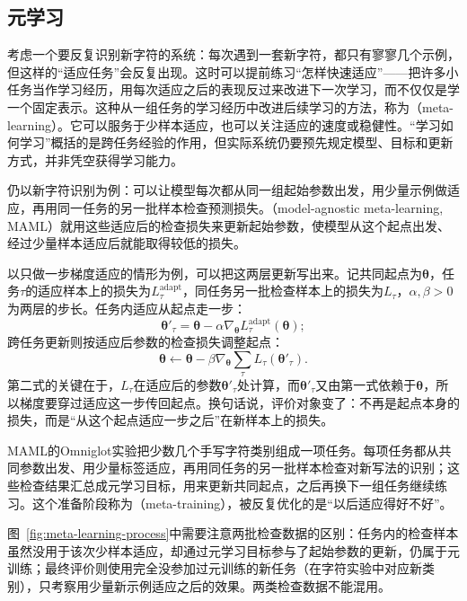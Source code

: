 \subsection{元学习}
\label{sec:meta-learning}

考虑一个要反复识别新字符的系统：每次遇到一套新字符，都只有寥寥几个示例，但这样的“适应任务”会反复出现。这时可以提前练习“怎样快速适应”——把许多小任务当作学习经历，用每次适应之后的表现反过来改进下一次学习，而不仅仅是学一个固定表示。这种从一组任务的学习经历中改进后续学习的方法，称为（meta-learning）。它可以服务于少样本适应，也可以关注适应的速度或稳健性。“学习如何学习”概括的是跨任务经验的作用，但实际系统仍要预先规定模型、目标和更新方式，并非凭空获得学习能力。

仍以新字符识别为例：可以让模型每次都从同一组起始参数出发，用少量示例做适应，再用同一任务的另一批样本检查预测损失。（model-agnostic meta-learning, MAML）就用这些适应后的检查损失来更新起始参数，使模型从这个起点出发、经过少量样本适应后就能取得较低的损失。

以只做一步梯度适应的情形为例，可以把这两层更新写出来。记共同起点为$\bm{\theta}$，任务$\tau$的适应样本上的损失为$L^{\mathrm{adapt}}_{\tau}$，同任务另一批检查样本上的损失为$L_{\tau}$，$\alpha,\beta>0$为两层的步长。任务内适应从起点走一步：
\begin{equation}
  \bm{\theta}'_{\tau}=\bm{\theta}-\alpha\nabla_{\bm{\theta}}L^{\mathrm{adapt}}_{\tau}(\bm{\theta});
  \label{eq:maml-inner-overview}
\end{equation}
跨任务更新则按适应后参数的检查损失调整起点：
\begin{equation}
  \bm{\theta}\leftarrow\bm{\theta}-\beta\nabla_{\bm{\theta}}\sum_{\tau}L_{\tau}(\bm{\theta}'_{\tau}).
  \label{eq:maml-outer-overview}
\end{equation}
第二式的关键在于，$L_{\tau}$在适应后的参数$\bm{\theta}'_{\tau}$处计算，而$\bm{\theta}'_{\tau}$又由第一式依赖于$\bm{\theta}$，所以梯度要穿过适应这一步传回起点。换句话说，评价对象变了：不再是起点本身的损失，而是“从这个起点适应一步之后”在新样本上的损失。

MAML的Omniglot实验把少数几个手写字符类别组成一项任务。每项任务都从共同参数出发、用少量标签适应，再用同任务的另一批样本检查对新写法的识别；这些检查结果汇总成元学习目标，用来更新共同起点，之后再换下一组任务继续练习。这个准备阶段称为（meta-training），被反复优化的是“以后适应得好不好”。

图~\ref{fig:meta-learning-process}中需要注意两批检查数据的区别：任务内的检查样本虽然没用于该次少样本适应，却通过元学习目标参与了起始参数的更新，仍属于元训练；最终评价则使用完全没参加过元训练的新任务（在字符实验中对应新类别），只考察用少量新示例适应之后的效果。两类检查数据不能混用。

